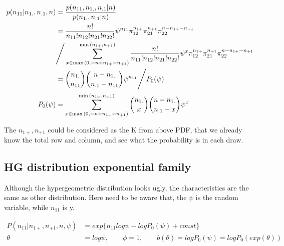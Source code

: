 \begin{align*}
	p(n_{11}| n_{1.}, n_{.1}, n)	&=   \frac{p(n_{11}, n_{1.}, n_{.1}| n)}{p( n_{1.}, n_{.1}| n)}\\
	&= \frac{n!}{n_{11}!n_{12}!n_{21}!n_{22}!} \psi^{n_{11}} \pi_{12}^{n_{1+}} \pi_{21}^{n_{+1}} \pi_{22}^{n-n_{1+}-n_{+1}}
	\\
	& \Bigg{/} \sum_{x \in \max{(0, -n + n_{1+} + n_{+1})}}^{\min{(n_{1+}, n_{+1})}} \frac{n!}{n_{11}!n_{12}!n_{21}!n_{22}!} \psi^{x} \pi_{12}^{n_{1+}} \pi_{21}^{n_{+1}} \pi_{22}^{n-n_{1+}-n_{+1}}\\
	&= {n_{1.} \choose n_{11}} {n-n_{1.} \choose n_{.1}-n_{11}} \psi^{n_{11}} \Bigg{/} P_0(\psi) \\
	P_0(\psi) &= \sum_{x \in \max{(0, -n + n_{1+} + n_{+1})}}^{\min{(n_{1+}, n_{+1})}} {n_{1.} \choose x} {n-n_{1.} \choose n_{.1}-x} \psi^{x}
\end{align*}


The $n_{1+}, n_{+1}$ could be considered as the K from above PDF, that we already know the total row and column, and see what the probability is in each draw. 


\subsection{HG distribution exponential family}
Although the hypergeometric distribution looks ugly, the characteristics are the same as other distribution. Here need to be aware that, the $\psi$ is the random variable, while $n_{11}$ is y.


\begin{align*}
	P(n_{11}| n_{1+}, n_{+1}, n, \psi) &= exp\{ n_{11} log \psi - log P_0(\psi) + const \} \\
	\theta &= log \psi, \qquad \phi = 1, \qquad b(\theta) = log P_0(\psi) = log P_0(exp(\theta))
\end{align*}

